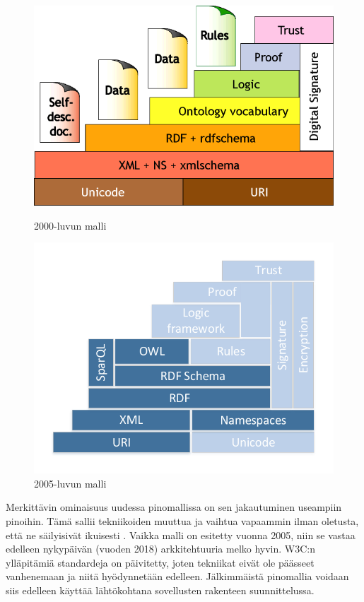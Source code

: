 \documentclass[finnish, 12pt, a4paper, elec, utf8, pdfa, online]{aaltothesis}
\begin{document}
{%
\begin{figure}[htb]
\begin{minipage}[b]{0.48\linewidth}
\includegraphics[width=\linewidth]{images/sweb-stack.png}
\caption{2000-luvun malli \cite{stack_bl} \label{images/sweb-stack.png}}
\end{minipage}
\hfill
\begin{minipage}[b]{0.48\linewidth}
\includegraphics[width=\linewidth]{images/sweb-stack2.pdf}
\caption{2005-luvun malli \cite{stack} \label{images/sweb-stack2.pdf}}
\end{minipage}%
\end{figure}

Merkittävin ominaisuus uudessa pinomallissa on sen jakautuminen useampiin pinoihin. Tämä sallii tekniikoiden muuttua ja vaihtua vapaammin ilman oletusta, että ne säilyisivät ikuisesti \cite{stack}. Vaikka malli on esitetty vuonna 2005, niin se vastaa edelleen nykypäivän (vuoden 2018) arkkitehtuuria melko hyvin. W3C:n ylläpitämiä standardeja on päivitetty, joten tekniikat eivät ole päässeet vanhenemaan ja niitä hyödynnetään edelleen. Jälkimmäistä pinomallia voidaan siis edelleen käyttää lähtökohtana sovellusten rakenteen suunnittelussa.

}
\end{document}
